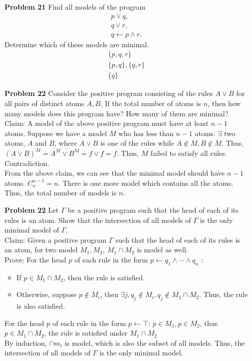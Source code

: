 \documentclass[12pt]{article}
\begin{document}
\begin{enumerate}
\item[\textbf{Problem 21}] Find all models of the program
\begin{gather*}
p\vee q, \\
q \vee r, \\
q \leftarrow p \wedge r. 
\end{gather*}
Determine which of these models are minimal. \\
\begin{gather*}
 \{p, q, r\} \\
 \{p,q\}, \{q, r\} \\
  \{q\}
\end{gather*}




\item[\textbf{Problem 22}] Consider the positive program consisting of the rules $A \vee B$ for all pairs of distinct atoms $A, B$. If the total number of atoms is $n$, then how many models does this program have? How many of them are minimal? \\
Claim: A model of the above positive program must have at least $n - 1$ atoms. 
Suppose we have a model $M$ who has less than $n - 1$ atoms. $\exists$ two atoms, $A$ and $B$, where $A \vee B$ is one of the rules while $A \not \in M, B \not \in M$. Thus, $(A \vee B)^M = A^M \vee B^M = f \vee f = f$. Thus, $M$ failed to satisfy all rules. Contradiction. \\
From the above claim, we can see that the minimal model should have $n - 1$ atoms. $C_{n}^{n - 1} = n$. There is one more model which contains all the atoms. Thus, the total number of models is $n$. 


\item[\textbf{Problem 22}] Let $\Gamma$ be a positive program such that the head of each of its rules is an atom. Show that the intersection of all models of $\Gamma$ is the only minimal model of $\Gamma$. \\
Claim: Given a positive program $\Gamma$ such that the head of each of its rules is an atom, for two model $M_1, M_2$, $M_1 \cap M_2$ is model as well.  \\
Prove: For the head $p$ of each rule in the form $p \leftarrow q_1 \wedge \cdots \wedge q_n$ :
\begin{itemize}
\item If $p \in M_1 \cap M_2$, then the rule is satisfied. 
\item Otherwise, suppose $p \not \in M_i$, then $\exists j, q_j \not \in M_i, q_j \not \in M_1 \cap M_2$. Thus, the rule is also satisfied.
\end{itemize}
For the head $p$ of each rule in the form $p \leftarrow \top$: 
$p \in M_1, p \in M_2$, thus $p \in M_1 \cap M_2$, the rule is satisfied under $M_1 \cap M_2$\\
By induction, $\cap m_i$ is model, which is also the subset of all models. Thus, the intersection of all models of $\Gamma$ is the only minimal model. 
\end{enumerate}
\end{document}

